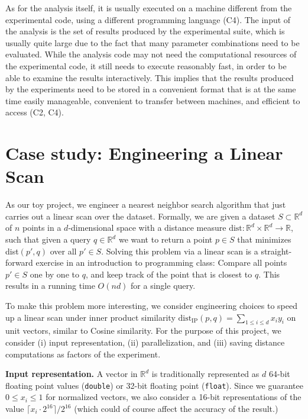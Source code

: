 \documentclass{llncs}
\newcommand{\myparagraph}[1]{\noindent \textbf{#1}}
\begin{document}
As for the analysis itself, it is usually executed on a machine different from the
experimental code, using a different programming language (C4).
The input of the analysis is the set of results produced by the experimental suite,
which is usually quite large due to the fact that many parameter combinations
need to be evaluated.
While the analysis code may not need the computational resources of the 
experimental code, it still needs to execute reasonably fast, in order to be able
to examine the results interactively.
This implies that the results produced by the experiments need to be 
stored in a convenient
format that is at the same time easily manageable, convenient to transfer between
machines, and efficient to access (C2, C4).



\section{Case study: Engineering a Linear Scan}

As our toy project, we engineer a nearest neighbor search algorithm that just carries out a linear scan over the dataset. 
Formally, we are given a dataset $S \subset \mathbb{R}^d$ of $n$ points in a $d$-dimensional space with a distance measure $\text{dist}\colon \mathbb{R}^d \times \mathbb{R}^d \rightarrow \mathbb{R}$, such that given a query $q \in \mathbb{R}^d$ we want to return a point $p \in S$ that minimizes dist$(p', q)$ over all $p' \in S$.
Solving this problem via a linear scan is a straight-forward exercise in an introduction to programming class: Compare all points $p' \in S$ one by one to $q$, and keep track of the point that is closest to $q$. This results in a running time $O(nd)$ for a single query.

To make this problem more interesting, we consider engineering choices to speed up a linear scan under inner product similarity $\text{dist}_{\text{IP}}(p,q) = \sum_{1 \leq i \leq d} x_i y_i$ on unit vectors, similar to Cosine similarity.
For the purpose of this project, we consider (i) input representation, (ii) parallelization, and (iii) saving distance computations as factors of the experiment.

\myparagraph{Input representation.}
A vector in $\mathbb{R}^d$ is traditionally represented as $d$ 64-bit floating point values (\texttt{double}) or 32-bit floating point (\texttt{float}). Since we guarantee $0 \leq x_i \leq 1$ for normalized vectors, we also consider a 16-bit representations of the value $\lceil x_i \cdot 2^{16} \rceil / 2^{16}$ (which could of course affect the accuracy of the result.)
\end{document}
